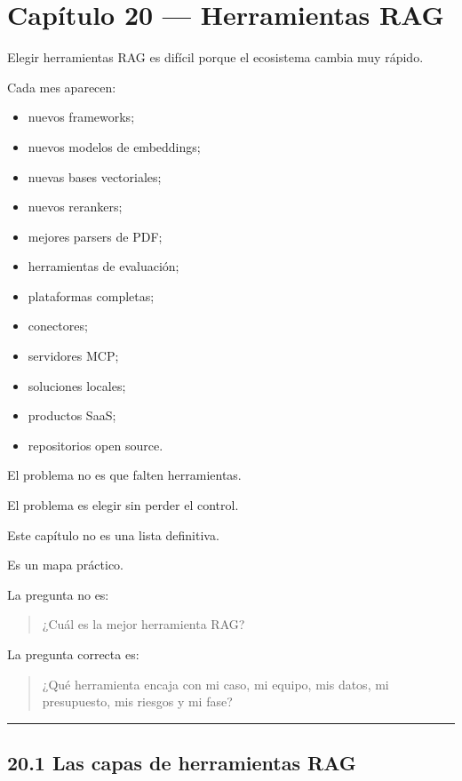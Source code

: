 \newpage

\chapter{Capítulo 20 --- Herramientas
RAG}\label{capuxedtulo-20-herramientas-rag}

Elegir herramientas RAG es difícil porque el ecosistema cambia muy
rápido.

Cada mes aparecen:

\begin{itemize}
\tightlist
\item
  nuevos frameworks;
\item
  nuevos modelos de embeddings;
\item
  nuevas bases vectoriales;
\item
  nuevos rerankers;
\item
  mejores parsers de PDF;
\item
  herramientas de evaluación;
\item
  plataformas completas;
\item
  conectores;
\item
  servidores MCP;
\item
  soluciones locales;
\item
  productos SaaS;
\item
  repositorios open source.
\end{itemize}

El problema no es que falten herramientas.

El problema es elegir sin perder el control.

Este capítulo no es una lista definitiva.

Es un mapa práctico.

La pregunta no es:

\begin{quote}
¿Cuál es la mejor herramienta RAG?
\end{quote}

La pregunta correcta es:

\begin{quote}
¿Qué herramienta encaja con mi caso, mi equipo, mis datos, mi
presupuesto, mis riesgos y mi fase?
\end{quote}

\begin{center}\rule{0.5\linewidth}{0.5pt}\end{center}

\section{20.1 Las capas de herramientas
RAG}\label{las-capas-de-herramientas-rag}

